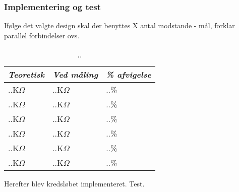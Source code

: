 \subsubsection{Implementering og test}
Ifølge det valgte design skal der benyttes X antal modstande - mål, forklar parallel forbindelser ovs.
\begin{table}[H]
	\centering
	\begin{tabular}{|l|l|l|}
		\hline
		\textit{Teoretisk} & \textit{Ved måling} & \textit{\% afvigelse} \\ \hline
		$..$K$\Omega$      & $..$K$\Omega$    & $..$\%           \\ \hline
		$..$K$\Omega$      & $..$K$\Omega$    & $..$\%           \\ \hline
		$..$K$\Omega$      & $..$K$\Omega$    & $..$\%           \\ \hline
		$..$K$\Omega$      & $..$K$\Omega$    & $..$\%           \\ \hline
		$..$K$\Omega$      & $..$K$\Omega$    & $..$\%           \\ \hline
		$..$K$\Omega$      & $..$K$\Omega$    & $..$\%           \\ \hline
	\end{tabular}
	\caption{..}
	\label{..}
\end{table}
\noindent Herefter blev kredsløbet implementeret. Test.

